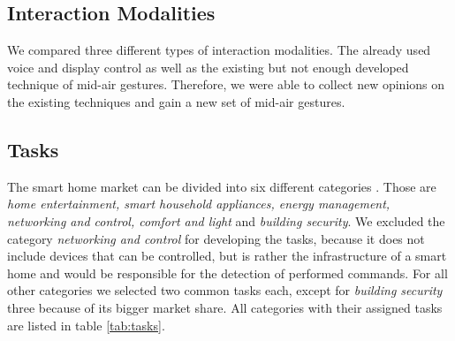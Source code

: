 \documentclass[sigchi]{acmart}
\begin{document}
\subsection{Interaction Modalities}
We compared three different types of interaction modalities. The already used voice and display control as well as the existing but not enough developed technique of mid-air gestures. Therefore, we were able to collect new opinions on the existing techniques and gain a new set of mid-air gestures.

\subsection{Tasks}
The smart home market can be divided into six different categories \cite{.c}. Those are \textit{home entertainment, smart household appliances, energy management, networking and control, comfort and light} and \textit{building security}. We excluded the category \textit{networking and control} for developing the tasks, because it does not include devices that can be controlled, but is rather the infrastructure of a smart home and would be responsible for the detection of performed commands. For all other categories we selected two common tasks \cite{.d} each, except for \textit{building security} three because of its bigger market share. All categories with their assigned tasks are listed in table \ref{tab:tasks}.
\end{document}
